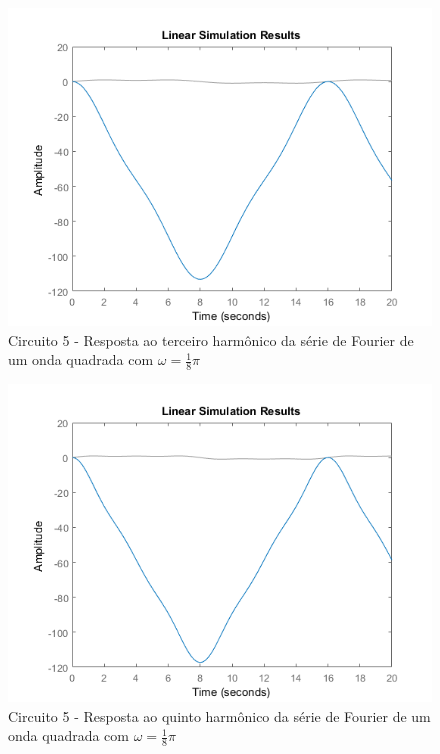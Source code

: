 \documentclass[a4paper, 12pt]{article}
\begin{document}
			\begin{figure}[!ht]
				\centering
				\includegraphics[scale=0.71]{img/1k_circ5.png}
				\caption{Circuito 5 - Resposta ao terceiro harmônico da série de Fourier de um onda quadrada com $\omega = \frac{1}{8}\pi$}
			\end{figure}
			\begin{figure}[!ht]
				\centering
				\includegraphics[scale=0.71]{img/1l_circ5.png}
				\caption{Circuito 5 - Resposta ao quinto harmônico da série de Fourier de um onda quadrada com $\omega = \frac{1}{8}\pi$}
			\end{figure}
\end{document}
